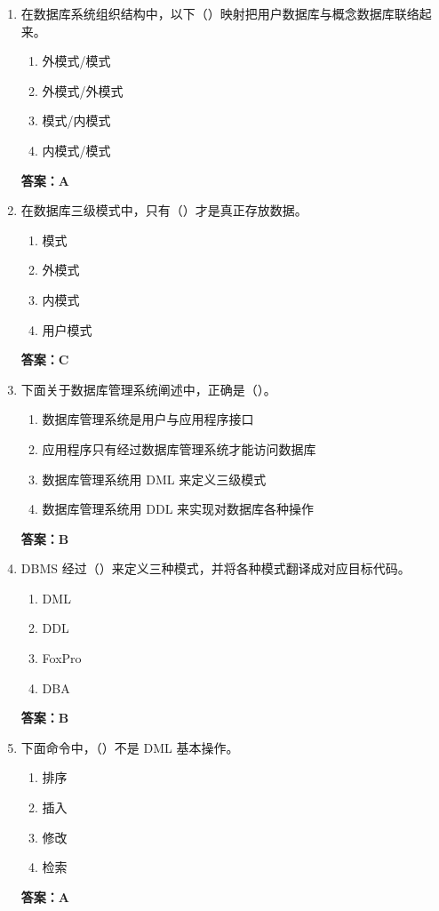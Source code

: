 \documentclass[12pt, a4paper]{article}
\begin{document}
\begin{enumerate}[label=\arabic*.]
    \item 在数据库系统组织结构中，以下（\quad）映射把用户数据库与概念数据库联络起来。
    \begin{enumerate}
        \item 外模式/模式
        \item 外模式/外模式
        \item 模式/内模式
        \item 内模式/模式
    \end{enumerate}
    \textbf{答案：A}

    \item 在数据库三级模式中，只有（\quad）才是真正存放数据。
    \begin{enumerate}
        \item 模式
        \item 外模式
        \item 内模式
        \item 用户模式
    \end{enumerate}
    \textbf{答案：C}

    \item 下面关于数据库管理系统阐述中，正确是（\quad）。
    \begin{enumerate}
        \item 数据库管理系统是用户与应用程序接口
        \item 应用程序只有经过数据库管理系统才能访问数据库
        \item 数据库管理系统用 DML 来定义三级模式
        \item 数据库管理系统用 DDL 来实现对数据库各种操作
    \end{enumerate}
    \textbf{答案：B}

    \item DBMS 经过（\quad）来定义三种模式，并将各种模式翻译成对应目标代码。
    \begin{enumerate}
        \item DML
        \item DDL
        \item FoxPro
        \item DBA
    \end{enumerate}
    \textbf{答案：B}

    \item 下面命令中，（\quad）不是 DML 基本操作。
    \begin{enumerate}
        \item 排序
        \item 插入
        \item 修改
        \item 检索
    \end{enumerate}
    \textbf{答案：A}


\end{enumerate}
\end{document}
